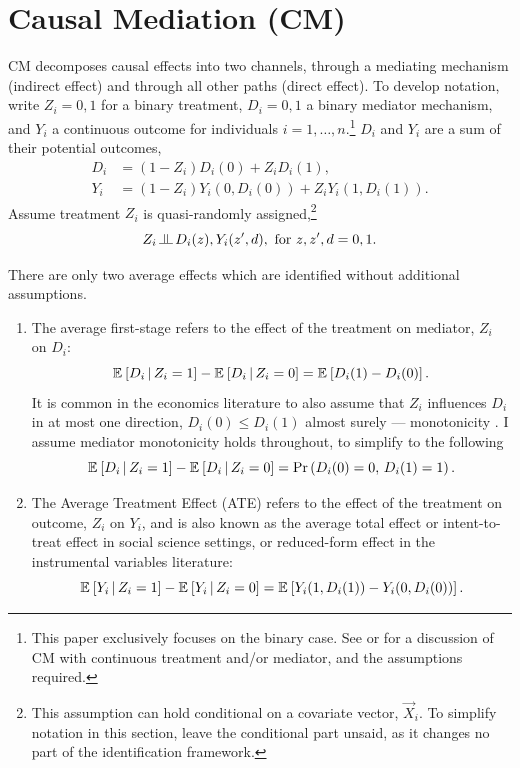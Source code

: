 \section{Causal Mediation (CM)}
\label{sec:mediation}
CM decomposes causal effects into two channels, through a mediating mechanism (indirect effect) and through all other paths (direct effect).
To develop notation, write $Z_i = 0, 1$ for a binary treatment, $D_i = 0, 1$ a binary mediator mechanism, and $Y_i$ a continuous outcome for individuals $i = 1, \hdots, n$.\footnote{
    This paper exclusively focuses on the binary case.
    See \cite{huber2020direct} or \cite{frolich2017direct} for a discussion of CM with continuous treatment and/or mediator, and the assumptions required.
}
$D_i$ and $Y_i$ are a sum of their potential outcomes,
\begin{align*}
    D_i &= (1 - Z_i) D_i(0)
        +   Z_i      D_i(1),  \\
    Y_i &= (1 - Z_i) Y_i(0, D_i(0))
        +   Z_i      Y_i(1, D_i(1)).
\end{align*}
Assume treatment $Z_i$ is quasi-randomly assigned,\footnote{
    This assumption can hold conditional on a covariate vector, $\vec X_i$.
    To simplify notation in this section, leave the conditional part unsaid, as it changes no part of the identification framework.
}
\[ Z_i \indep  D_i(z), Y_i(z', d), \text{ for } z, z', d = 0, 1. \]

There are only two average effects which are identified without additional assumptions.
\begin{enumerate}
    \item The average first-stage refers to the effect of the treatment on mediator, $Z_i$ on $D_i$:
    \[ \mathbb{E}_{} \left[ D_i \, \middle\vert \, Z_i = 1 \right] - \mathbb{E}_{} \left[ D_i \, \middle\vert \, Z_i = 0 \right]
        = \mathbb{E}_{} \left[ D_i(1) - D_i(0) \right]. \]
    It is common in the economics literature to also assume that $Z_i$ influences $D_i$ in at most one direction, $D_i(0) \leq D_i(1)$ almost surely --- monotonicity \citep{imbens1994identification}.
    I assume mediator monotonicity holds throughout, to simplify  to the following
    \[ \mathbb{E}_{} \left[ D_i \, \middle\vert \, Z_i = 1 \right] - \mathbb{E}_{} \left[ D_i \, \middle\vert \, Z_i = 0 \right]
        = \Pr\left( D_i(0) = 0,\,D_i(1)=1 \right). \]
    \item The Average Treatment Effect (ATE) refers to the effect of the treatment on outcome, $Z_i$ on $Y_i$, and is also known as the average total effect or intent-to-treat effect in social science settings, or reduced-form effect in the instrumental variables literature:
    \[ \mathbb{E}_{} \left[ Y_i \, \middle\vert \, Z_i = 1 \right] - \mathbb{E}_{} \left[ Y_i \, \middle\vert \, Z_i = 0 \right]
        = \mathbb{E}_{} \left[ Y_i(1, D_i(1)) - Y_i(0, D_i(0)) \right]. \]
\end{enumerate}

